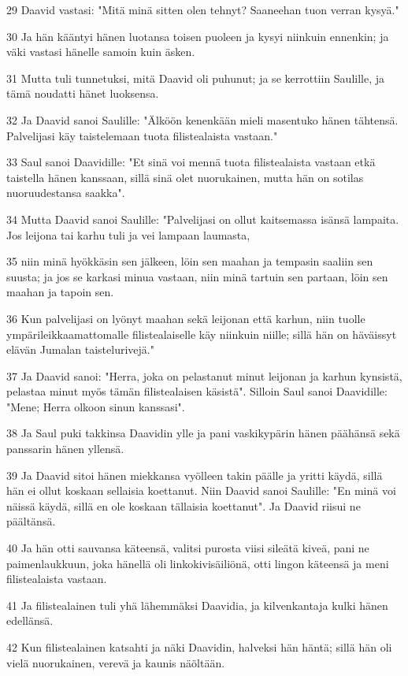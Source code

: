 \par 29 Daavid vastasi: "Mitä minä sitten olen tehnyt? Saaneehan tuon verran kysyä."
\par 30 Ja hän kääntyi hänen luotansa toisen puoleen ja kysyi niinkuin ennenkin; ja väki vastasi hänelle samoin kuin äsken.
\par 31 Mutta tuli tunnetuksi, mitä Daavid oli puhunut; ja se kerrottiin Saulille, ja tämä noudatti hänet luoksensa.
\par 32 Ja Daavid sanoi Saulille: "Älköön kenenkään mieli masentuko hänen tähtensä. Palvelijasi käy taistelemaan tuota filistealaista vastaan."
\par 33 Saul sanoi Daavidille: "Et sinä voi mennä tuota filistealaista vastaan etkä taistella hänen kanssaan, sillä sinä olet nuorukainen, mutta hän on sotilas nuoruudestansa saakka".
\par 34 Mutta Daavid sanoi Saulille: "Palvelijasi on ollut kaitsemassa isänsä lampaita. Jos leijona tai karhu tuli ja vei lampaan laumasta,
\par 35 niin minä hyökkäsin sen jälkeen, löin sen maahan ja tempasin saaliin sen suusta; ja jos se karkasi minua vastaan, niin minä tartuin sen partaan, löin sen maahan ja tapoin sen.
\par 36 Kun palvelijasi on lyönyt maahan sekä leijonan että karhun, niin tuolle ympärileikkaamattomalle filistealaiselle käy niinkuin niille; sillä hän on häväissyt elävän Jumalan taistelurivejä."
\par 37 Ja Daavid sanoi: "Herra, joka on pelastanut minut leijonan ja karhun kynsistä, pelastaa minut myös tämän filistealaisen käsistä". Silloin Saul sanoi Daavidille: "Mene; Herra olkoon sinun kanssasi".
\par 38 Ja Saul puki takkinsa Daavidin ylle ja pani vaskikypärin hänen päähänsä sekä panssarin hänen yllensä.
\par 39 Ja Daavid sitoi hänen miekkansa vyölleen takin päälle ja yritti käydä, sillä hän ei ollut koskaan sellaisia koettanut. Niin Daavid sanoi Saulille: "En minä voi näissä käydä, sillä en ole koskaan tällaisia koettanut". Ja Daavid riisui ne päältänsä.
\par 40 Ja hän otti sauvansa käteensä, valitsi purosta viisi sileätä kiveä, pani ne paimenlaukkuun, joka hänellä oli linkokivisäiliönä, otti lingon käteensä ja meni filistealaista vastaan.
\par 41 Ja filistealainen tuli yhä lähemmäksi Daavidia, ja kilvenkantaja kulki hänen edellänsä.
\par 42 Kun filistealainen katsahti ja näki Daavidin, halveksi hän häntä; sillä hän oli vielä nuorukainen, verevä ja kaunis näöltään.
